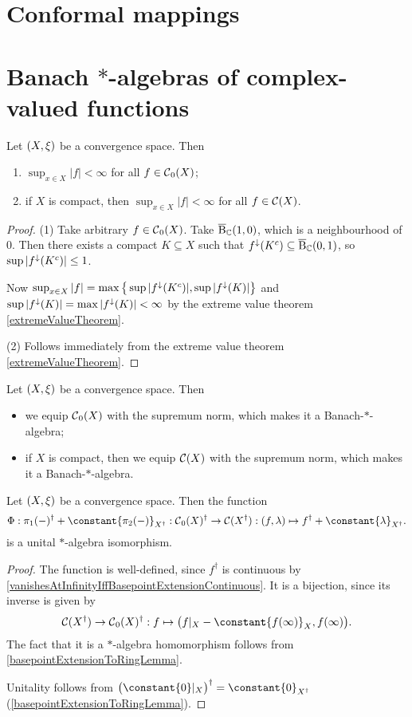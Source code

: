 \section{Conformal mappings}

\section{Banach $*$-algebras of complex-valued functions}
\begin{lemma}
Let $\sSet{X,\xi}$ be a convergence space. Then
\begin{enumerate}
\item $\sup_{x\in X}|f| <\infty$ for all $f\in \operatorname{\mathcal{C}}_0(X)$;
\item if $X$ is compact, then $\sup_{x\in X}|f| <\infty$ for all $f\in \operatorname{\mathcal{C}}(X)$.
\end{enumerate}
\end{lemma}
\begin{proof}
(1) Take arbitrary $f\in \operatorname{\mathcal{C}}_0(X)$. Take $\operatorname{\overline{B}}_{\mathbb{C}}(1,0)$, which is a neighbourhood of $0$. Then there exists a compact $K\subseteq X$ such that $f^{\downarrow}(K^c) \subseteq \operatorname{\overline{B}}_{\mathbb{C}}(0,1)$, so $\sup |f^{\downarrow}(K^c)| \leq 1$.

Now $\sup_{x\in X}|f| = \max\big\{\sup |f^{\downarrow}(K^c)|, \sup |f^{\downarrow}(K)|\big\}$ and $\sup |f^{\downarrow}(K)| = \max |f^\downarrow(K)| < \infty$ by the extreme value theorem \ref{extremeValueTheorem}.

(2) Follows immediately from the extreme value theorem \ref{extremeValueTheorem}.
\end{proof}

\begin{definition}
Let $\sSet{X,\xi}$ be a convergence space. Then
\begin{itemize}
\item we equip $\operatorname{\mathcal{C}}_0(X)$ with the supremum norm, which makes it a Banach-$*$-algebra;
\item if $X$ is compact, then we equip $\operatorname{\mathcal{C}}(X)$ with the supremum norm, which makes it a Banach-$*$-algebra.
\end{itemize} 
\end{definition}

\begin{proposition} \label{unitisationOnePointCompactificationIsomorphism}
Let $\sSet{X,\xi}$ be a convergence space. Then the function
\[ \Phi: \proj_1(-)^\dagger + \constant{\proj_2(-)}_{X^\dagger}: \cont_0(X)^\dagger \to \cont(X^\dagger): (f, \lambda) \mapsto f^\dagger + \constant{\lambda}_{X^\dagger}. \]
is a unital $*$-algebra isomorphism.
\end{proposition}
\begin{proof}
The function is well-defined, since $f^\dagger$ is continuous by \ref{vanishesAtInfinityIffBasepointExtensionContinuous}. It is a bijection, since its inverse is given by
\[ \cont(X^\dagger) \to \cont_0(X)^\dagger: f\mapsto \big(f|_X - \constant{f(\infty)}_X, f(\infty)\big). \]
The fact that it is a $*$-algebra homomorphism follows from \ref{basepointExtensionToRingLemma}.

Unitality follows from $\big(\constant{0}|_X\big)^\dagger = \constant{0}_{X^\dagger}$ (\ref{basepointExtensionToRingLemma}).
\end{proof}

